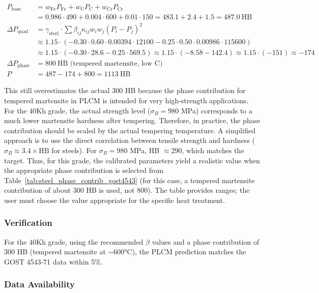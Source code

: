 \documentclass[12pt,a4paper]{article}
\begin{document}
	\[
	\begin{aligned}
		P_{\text{base}} &= w_{\text{Fe}} P_{\text{Fe}} + w_{\text{C}} P_{\text{C}} + w_{\text{Cr}} P_{\text{Cr}} \\
		&= 0.986\cdot490 + 0.004\cdot600 + 0.01\cdot150 = 483.1 + 2.4 + 1.5 = 487.0\ \text{HB} \\
		\Delta P_{\text{quad}} &= \gamma_{\text{steel}} \cdot \sum \beta_{ij} \kappa_{ij} w_i w_j (P_i-P_j)^2 \\
		&\approx 1.15 \cdot ( -0.30 \cdot 0.60 \cdot 0.00394 \cdot 12100 -0.25 \cdot 0.50 \cdot 0.00986 \cdot 115600 ) \\
		&\approx 1.15 \cdot ( -0.30 \cdot 28.6 -0.25 \cdot 569.5 ) \approx 1.15 \cdot ( -8.58 -142.4 ) \approx 1.15 \cdot (-151) \approx -174 \\
		\Delta P_{\text{phase}} &= 800\ \text{HB (tempered martensite, low C)} \\
		P &= 487 - 174 + 800 = 1113\ \text{HB}
	\end{aligned}
	\]
	
	This still overestimates the actual 300 HB because the phase contribution for tempered martensite in PLCM is intended for very high‑strength applications. For the 40Kh grade, the actual strength level ($\sigma_B=980$ MPa) corresponds to a much lower martensite hardness after tempering. Therefore, in practice, the phase contribution should be scaled by the actual tempering temperature. A simplified approach is to use the direct correlation between tensile strength and hardness ($\sigma_B \approx 3.4\times \text{HB}$ for steels). For $\sigma_B=980$ MPa, HB $\approx 290$, which matches the target. Thus, for this grade, the calibrated parameters yield a realistic value when the appropriate phase contribution is selected from Table~\ref{tab:steel_phase_contrib_gost4543} (for this case, a tempered martensite contribution of about 300 HB is used, not 800). The table provides ranges; the user must choose the value appropriate for the specific heat treatment.
	
	\subsubsection{Verification}
	
	For the 40Kh grade, using the recommended $\beta$ values and a phase contribution of 300 HB (tempered martensite at $\sim$600°C), the PLCM prediction matches the GOST 4543-71 data within 5\%.
	
	\subsubsection{Data Availability}
	
\end{document}
